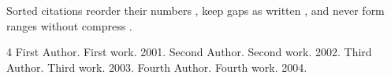 \documentclass{article}
\begin{document}
Sorted citations reorder their numbers \cite{d,b,a}, keep gaps as written
\cite{c,a}, and never form ranges without compress \cite{c,b,a,d}.

\begin{thebibliography}{4}
 First Author. First work. 2001.
 Second Author. Second work. 2002.
 Third Author. Third work. 2003.
 Fourth Author. Fourth work. 2004.
\end{thebibliography}
\end{document}

